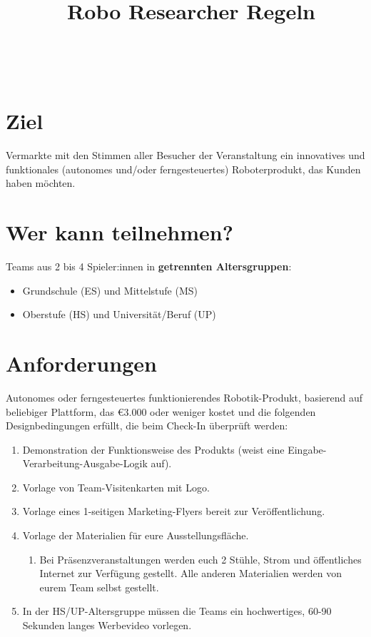 \documentclass[a4paper,12pt]{article}
\begin{document}



\title{\tagYear\ Robo Researcher Regeln}

\makeatletter
\let\inserttitle\@title
\makeatother
\begin{center}
	\rrgerLogo
	\huge                      %
	\bfseries                   %
	\\
	\inserttitle
\end{center}

\section{Ziel}
Vermarkte mit den Stimmen aller Besucher der Veranstaltung ein innovatives und
funktionales (autonomes und/oder ferngesteuertes) Roboterprodukt, das Kunden
haben möchten.

\section{Wer kann teilnehmen?}
Teams aus 2 bis 4 Spieler:innen in \textbf{getrennten Altersgruppen}:

\begin{itemize}
	\item Grundschule (ES) und Mittelstufe (MS)
	\item Oberstufe (HS) und Universität/Beruf (UP)
\end{itemize}
\combineDivisions
\declareExhibition

\section{Anforderungen}
Autonomes oder ferngesteuertes funktionierendes Robotik-Produkt, basierend auf
beliebiger Plattform, das \euro{3.000} oder weniger kostet und die folgenden
Designbedingungen erfüllt, die beim Check-In überprüft werden:
\begin{enumerate}
	\item Demonstration der Funktionsweise des Produkts (weist eine
		Eingabe-Verarbeitung-Ausgabe-Logik auf).
	\item Vorlage von Team-Visitenkarten mit Logo.
	\item Vorlage eines 1-seitigen Marketing-Flyers bereit zur
		Veröffentlichung.
	\item Vorlage der Materialien für eure Ausstellungsfläche.
	\begin{enumerate}
		\item Bei Präsenzveranstaltungen werden euch 2 Stühle, Strom
			und öffentliches Internet zur Verfügung gestellt.
			Alle anderen Materialien werden von eurem Team selbst
			gestellt.
	\end{enumerate}
	\item In der HS/UP-Altersgruppe müssen die Teams ein hochwertiges,
		60-90 Sekunden langes Werbevideo vorlegen.
\end{enumerate}
\end{document}
